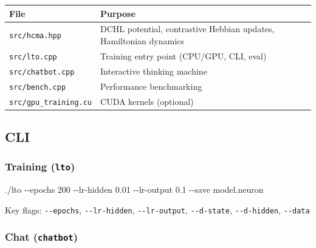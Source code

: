 \documentclass[
  11pt,
  a4paper,
]{article}
\newenvironment{Shaded}{\begin{snugshade}}{\end{snugshade}}
\newcommand{\AttributeTok}[1]{\textcolor[rgb]{0.13,0.29,0.53}{#1}}
\newcommand{\ExtensionTok}[1]{#1}
\newcommand{\NormalTok}[1]{#1}
\begin{document}
\begin{longtable}[]{@{}
  >{\raggedright\arraybackslash}p{}
  >{\raggedright\arraybackslash}p{}@{}}
\toprule\noalign{}
\begin{minipage}[b]{\linewidth}\raggedright
File
\end{minipage} & \begin{minipage}[b]{\linewidth}\raggedright
Purpose
\end{minipage} \\
\midrule\noalign{}
\endhead
\bottomrule\noalign{}
\endlastfoot
\texttt{src/hcma.hpp} & DCHL potential, contrastive Hebbian updates,
Hamiltonian dynamics \\
\texttt{src/lto.cpp} & Training entry point (CPU/GPU, CLI, eval) \\
\texttt{src/chatbot.cpp} & Interactive thinking machine \\
\texttt{src/bench.cpp} & Performance benchmarking \\
\texttt{src/gpu\_training.cu} & CUDA kernels (optional) \\
\end{longtable}

\subsection{CLI}\label{cli}

\subsubsection{\texorpdfstring{Training
(\texttt{lto})}{Training (lto)}}\label{training-lto}

\begin{Shaded}
\begin{Highlighting}[]
\ExtensionTok{./lto} \AttributeTok{{-}{-}epochs}\NormalTok{ 200 }\AttributeTok{{-}{-}lr{-}hidden}\NormalTok{ 0.01 }\AttributeTok{{-}{-}lr{-}output}\NormalTok{ 0.1 }\AttributeTok{{-}{-}save}\NormalTok{ model.neuron}
\end{Highlighting}
\end{Shaded}

Key flags: \texttt{-\/-epochs}, \texttt{-\/-lr-hidden},
\texttt{-\/-lr-output}, \texttt{-\/-d-state}, \texttt{-\/-d-hidden},
\texttt{-\/-data}

\subsubsection{\texorpdfstring{Chat
(\texttt{chatbot})}{Chat (chatbot)}}\label{chat-chatbot}
\end{document}
